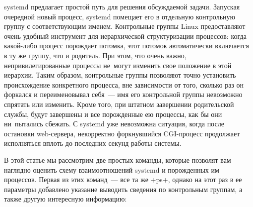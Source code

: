 \documentclass[10pt,oneside,a4paper]{article}
\begin{document}
systemd предлагает простой путь для решения обсуждаемой задачи. Запуская
очередной новый процесс, systemd помещает его в отдельную контрольную группу
с соответствующим именем. Контрольные группы Linux предоставляют очень
удобный инструмент для иерархической структуризации процессов: когда
какой-либо процесс порождает потомка, этот потомок автоматически включается в
ту же группу, что и родитель. При этом, что очень важно, непривилегированные
процессы не~могут изменить свое положение в этой иерархии. Таким образом,
контрольные группы позволяют точно установить происхождение конкретного
процесса, вне зависимости от того, сколько раз он форкался и переименовывал
себя~--- имя его контрольной группы невозможно спрятать или изменить. Кроме
того, при штатном завершении родительской службы, будут завершены и все
порожденные ею процессы, как бы они ни~пытались сбежать. С systemd уже
невозможна ситуация, когда после остановки web-сервера, некорректно
форкнувшийся CGI-процесс продолжает исполняться вплоть до последних секунд
работы системы.

В этой статье мы рассмотрим две простых команды, которые позволят вам
наглядно оценить схему взаимоотношений systemd и порожденных им процессов.
Первая из этих команд~--- все та же +ps+, однако на этот раз в ее параметры
добавлено указание выводить сведения по контрольным группам, а также другую
интересную информацию: 
\end{document}
